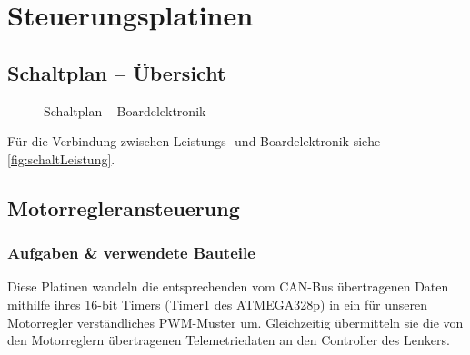 \section{Steuerungsplatinen}
\subsection{Schaltplan -- Übersicht}
\begin{figure}[H]
    \caption{Schaltplan -- Boardelektronik\label{fig:schaltBoard}}
\end{figure}
Für die Verbindung zwischen Leistungs- und Boardelektronik siehe \autoref{fig:schaltLeistung}.


\clearpage
\subsection{Motorregleransteuerung}
\subsubsection{Aufgaben \& verwendete Bauteile}
Diese Platinen wandeln die entsprechenden vom CAN-Bus übertragenen Daten mithilfe ihres 16-bit Timers (Timer1 des ATMEGA328p) in ein für unseren Motorregler verständliches PWM-Muster um.
Gleichzeitig übermitteln sie die von den Motorreglern übertragenen Telemetriedaten an den Controller des Lenkers.

